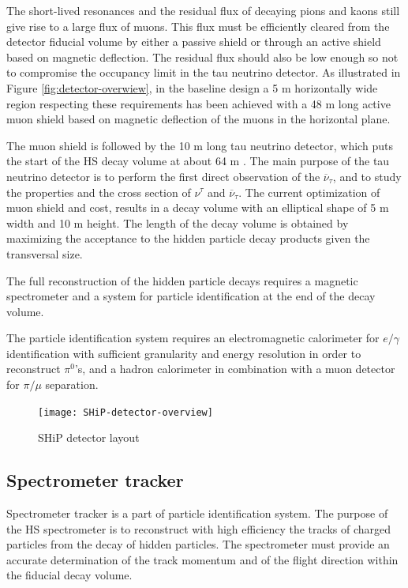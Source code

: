 	The short-lived resonances and the residual flux of decaying pions and kaons still give rise to a large flux of muons. This flux must be efficiently cleared from the detector fiducial volume by either a passive shield or through an active shield based on magnetic deflection. The residual flux should also be low enough so not to compromise the occupancy limit in the tau neutrino detector. As illustrated in Figure \ref{fig:detector-overwiew}, in the baseline design a 5 m horizontally wide region respecting these requirements has been achieved with a 48 m long active muon shield based on magnetic deflection of the muons in the horizontal plane.
	 
	The muon shield is followed by the 10 m long tau neutrino detector, which puts the start of the HS decay volume at about 64 m \cite{ship_TP}. The main purpose of the tau neutrino detector is to perform the first direct observation of the $\overline{\nu}_\tau$, and to study the properties and the cross section of $\nu^\tau$ and $\overline{\nu}_\tau$.
 The current optimization of muon shield and cost, results in a decay volume with an elliptical shape of 5 m width and 10 m height. The length of the decay volume is obtained by maximizing the acceptance to the hidden particle decay products given the transversal size.

	The full reconstruction of the hidden particle decays requires a magnetic spectrometer and a system for particle identification at the end of the decay volume.
	
	The particle identification system requires an electromagnetic calorimeter for $e / \gamma$ identification with sufficient granularity and energy resolution in order to reconstruct $\pi^0$'s, and a hadron calorimeter in combination with a muon detector for $ \pi / \mu$ separation.
	
	\begin{figure}[!h]
	\centering
	\texttt{[image: SHiP-detector-overview]}
	\caption{SHiP detector layout}
	\end{figure}
	
	\subsection{Spectrometer tracker}
	
	Spectrometer tracker is a part of particle identification system.  The purpose of the HS spectrometer is to reconstruct with high efficiency the tracks of charged particles from the decay of hidden particles. The spectrometer must provide an accurate determination of the track momentum and of the flight direction within the fiducial decay volume.
	

